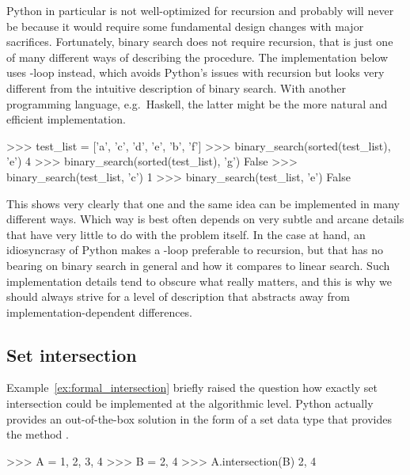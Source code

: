 \begin{programming}
Python in particular is not well-optimized for recursion and probably will never be because it would require some fundamental design changes with major sacrifices.
Fortunately, binary search does not require recursion, that is just one of many different ways of describing the procedure.
The implementation below uses -loop instead, which avoids Python's issues with recursion but looks very different from the intuitive description of binary search.
With another programming language, e.g.~Haskell, the latter might be the more natural and efficient implementation.
%
\begin{center}
\end{center}
\begin{center}
    \begin{pythoncode}
    >>> test_list = ['a', 'c', 'd', 'e', 'b', 'f']
    >>> binary_search(sorted(test_list), 'e')
    4
    >>> binary_search(sorted(test_list), 'g')
    False
    >>> binary_search(test_list, 'c')
    1
    >>> binary_search(test_list, 'e')
    False
    \end{pythoncode}
\end{center}

This shows very clearly that one and the same idea can be implemented in many different ways.
Which way is best often depends on very subtle and arcane details that have very little to do with the problem itself. 
In the case at hand, an idiosyncrasy of Python makes a -loop preferable to recursion, but that has no bearing on binary search in general and how it compares to linear search.
Such implementation details tend to obscure what really matters, and this is why we should always strive for a level of description that abstracts away from implementation-dependent differences.

\subsection{Set intersection}
\label{ssec:formal_code_setintersection}

Example~\ref{ex:formal_intersection} briefly raised the question how exactly set intersection could be implemented at the algorithmic level.
Python actually provides an out-of-the-box solution in the form of a set data type that provides the method .

\begin{center}
    \begin{pythoncode}
    >>> A = {1, 2, 3, 4}
    >>> B = {2, 4}
    >>> A.intersection(B)
    {2, 4}
    \end{pythoncode}
\end{center}


\end{programming}
